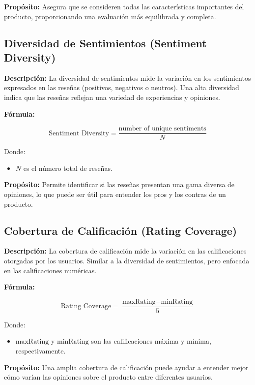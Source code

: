 \documentclass{llncs}
\begin{document}
    \textbf{Propósito:}  
    Asegura que se consideren todas las características importantes del producto, proporcionando una evaluación más equilibrada y completa.

    \subsection{Diversidad de Sentimientos (Sentiment Diversity)}

    \textbf{Descripción:}  
    La diversidad de sentimientos mide la variación en los sentimientos expresados en las reseñas (positivos, negativos o neutros). Una alta diversidad indica que las reseñas reflejan una variedad de experiencias y opiniones.

    \textbf{Fórmula:}

    \[
    \text{Sentiment Diversity} = \frac{\text{number of unique sentiments}}{N}
    \]

    Donde:
    \begin{itemize}
        \item \( N \) es el número total de reseñas.
    \end{itemize}

    \textbf{Propósito:}  
    Permite identificar si las reseñas presentan una gama diversa de opiniones, lo que puede ser útil para entender los pros y los contras de un producto.

    \subsection{Cobertura de Calificación (Rating Coverage)}

    \textbf{Descripción:}  
    La cobertura de calificación mide la variación en las calificaciones otorgadas por los usuarios. Similar a la diversidad de sentimientos, pero enfocada en las calificaciones numéricas.

    \textbf{Fórmula:}

    \[
    \text{Rating Coverage} = \frac{\text{maxRating} - \text{minRating}}{5}
    \]

    Donde:
    \begin{itemize}
        \item \( \text{maxRating} \) y \( \text{minRating} \) son las calificaciones máxima y mínima, respectivamente.
    \end{itemize}

    \textbf{Propósito:}  
    Una amplia cobertura de calificación puede ayudar a entender mejor cómo varían las opiniones sobre el producto entre diferentes usuarios.
\end{document}
